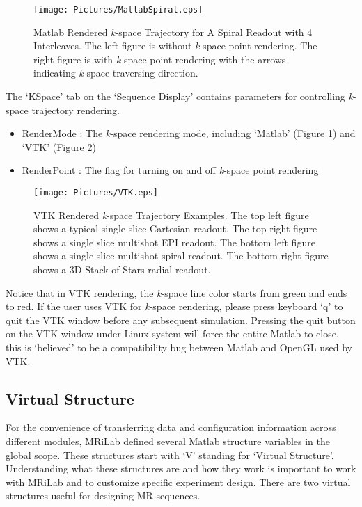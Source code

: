 \documentclass{book}%
\begin{document}
\begin{enumerate}
\begin{figure}[htbp]
	\centering
		\texttt{[image: Pictures/MatlabSpiral.eps]}
	\caption{Matlab Rendered \textit{k}-space Trajectory for A Spiral Readout with 4 Interleaves. The left figure is without \textit{k}-space point rendering. The right figure is with \textit{k}-space point rendering with the arrows indicating \textit{k}-space traversing direction.}
	\label{fig:MatlabSpiral}
\end{figure}	
	
The `KSpace' tab on the `Sequence Display' contains parameters for controlling \textit{k}-space trajectory rendering.

\begin{itemize}
	\item RenderMode : The \textit{k}-space rendering mode, including `Matlab' (Figure \ref{fig:MatlabSpiral}) and `VTK' (Figure \ref{fig:VTK})
	\item RenderPoint : The flag for turning on and off \textit{k}-space point rendering
\end{itemize}	

\begin{figure}[htbp]
	\centering
		\texttt{[image: Pictures/VTK.eps]}
	\caption{VTK Rendered \textit{k}-space Trajectory Examples. The top left figure shows a typical single slice Cartesian readout. The top right figure shows a single slice multishot EPI readout. The bottom left figure shows a single slice multishot spiral readout. The bottom right figure shows a 3D Stack-of-Stars radial readout.}
	\label{fig:VTK}
\end{figure}		
	
Notice that in VTK rendering, the \textit{k}-space line color starts from green and ends to red. If the user uses VTK for \textit{k}-space rendering, please press keyboard `q' to quit the VTK window before any subsequent simulation. Pressing the quit button on the VTK window under Linux system will force the entire Matlab to close, this is `believed' to be a compatibility bug between Matlab and OpenGL used by VTK.

\end{enumerate}	

\subsection{Virtual Structure}
For the convenience of transferring data and configuration information across different modules, MRiLab defined several Matlab structure variables in the global scope. These structures start with `V' standing for `Virtual Structure'. Understanding what these structures are and how they work is important to work with MRiLab and to customize specific experiment design. There are two virtual structures useful for designing MR sequences.
\end{document}
